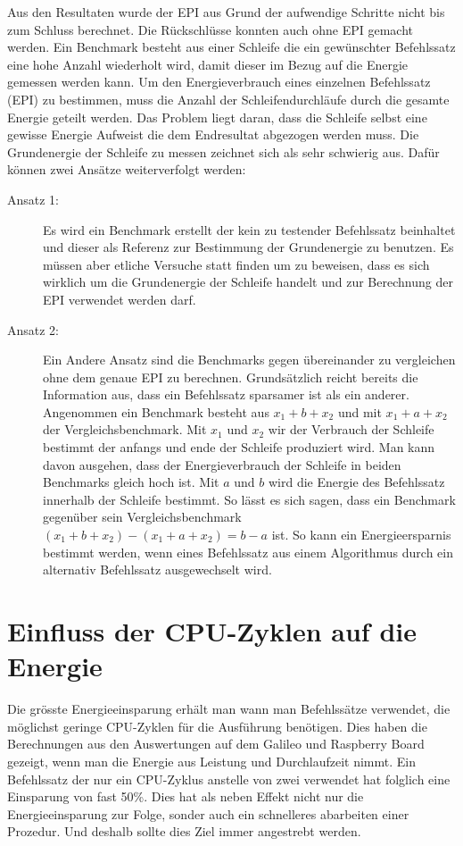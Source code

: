 Aus den Resultaten wurde der EPI aus Grund der aufwendige Schritte nicht bis zum Schluss berechnet. Die Rückschlüsse konnten auch ohne EPI gemacht werden. Ein Benchmark besteht aus einer Schleife die ein gewünschter Befehlssatz eine hohe Anzahl wiederholt wird, damit dieser im Bezug auf die Energie gemessen werden kann. Um den Energieverbrauch eines einzelnen Befehlssatz (EPI) zu bestimmen, muss die Anzahl der Schleifendurchläufe durch die gesamte Energie geteilt werden. Das Problem liegt daran, dass die Schleife selbst eine gewisse Energie Aufweist die dem Endresultat abgezogen werden muss. Die Grundenergie der Schleife zu messen zeichnet sich als sehr schwierig aus. Dafür können zwei Ansätze weiterverfolgt werden:
\begin{description}
\item[Ansatz 1:]
Es wird ein Benchmark erstellt der kein zu testender Befehlssatz beinhaltet und dieser als Referenz zur Bestimmung der Grundenergie zu benutzen. Es müssen aber etliche Versuche statt finden um zu beweisen, dass es sich wirklich um die Grundenergie der Schleife handelt und zur Berechnung der EPI verwendet werden darf.
\par
\item[Ansatz 2:]
Ein Andere Ansatz sind die Benchmarks gegen übereinander zu vergleichen ohne dem genaue EPI zu berechnen. Grundsätzlich reicht bereits die Information aus, dass ein Befehlssatz sparsamer ist als ein anderer. Angenommen ein Benchmark besteht aus $x_1 + b + x_2$ und mit $x_1 + a + x_2$ der Vergleichsbenchmark. Mit $x_1$ und $x_2$ wir der Verbrauch der Schleife bestimmt der anfangs und ende der Schleife produziert wird. Man kann davon ausgehen, dass der Energieverbrauch der Schleife in beiden Benchmarks gleich hoch ist. Mit $a$ und $b$ wird die Energie des Befehlssatz innerhalb der Schleife bestimmt. So lässt es sich sagen, dass ein Benchmark gegenüber sein Vergleichsbenchmark $(x_1 + b + x_2) - (x_1 + a + x_2) = b - a$ ist. So kann ein Energieersparnis bestimmt werden, wenn eines Befehlssatz aus einem Algorithmus durch ein alternativ Befehlssatz ausgewechselt wird.
\end{description}


\section{Einfluss der CPU-Zyklen auf die Energie}
Die grösste Energieeinsparung erhält man wann man Befehlssätze verwendet, die möglichst geringe CPU-Zyklen für die Ausführung benötigen. Dies haben die Berechnungen aus den Auswertungen auf dem Galileo und Raspberry Board gezeigt, wenn man die Energie aus Leistung und Durchlaufzeit nimmt. Ein Befehlssatz der nur ein CPU-Zyklus anstelle von zwei verwendet hat folglich eine Einsparung von fast 50\%. Dies hat als neben Effekt nicht nur die Energieeinsparung zur Folge, sonder auch ein schnelleres abarbeiten einer Prozedur. Und deshalb sollte dies Ziel immer angestrebt werden.

